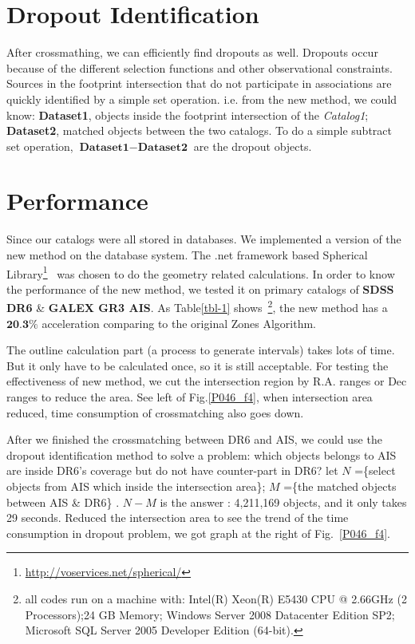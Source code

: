 \documentclass[11pt,twoside]{article}
\begin{document}
\section{Dropout Identification}
After crossmathing, we can efficiently find dropouts as well. Dropouts occur because of the different selection functions and other observational constraints. Sources in the footprint intersection that do not participate in associations are quickly identified by a simple set operation. i.e. from the new method, we could know: \textbf{Dataset1}, objects inside the footprint intersection of the \textit{Catalog1}; \textbf{Dataset2}, matched objects between the two catalogs. To do a simple subtract set operation, $\textbf{Dataset1}-\textbf{Dataset2}$ are the dropout objects.

\section{Performance}
Since our catalogs were all stored in databases. We implemented a version of the new method on the database system. The .net framework based Spherical Library\footnote{\url{http://voservices.net/spherical/}}~\citep{Budavari:2010ek, 2007cs........1163G} was chosen to do the geometry related calculations. In order to know the performance of the new method, we tested it on primary catalogs of \textbf{SDSS DR6} \& \textbf{GALEX GR3 AIS}. As Table\ref{tbl-1} shows~\footnote{all codes run on a machine with: Intel(R) Xeon(R) E5430 CPU @ 2.66GHz (2 Processors);24 GB Memory; Windows Server 2008 Datacenter Edition SP2; Microsoft SQL Server 2005 Developer Edition (64-bit).}, the new method has a $\textbf{20.3\%}$ acceleration comparing to the original Zones Algorithm.

The outline calculation part (a process to generate intervals) takes lots of time. But it only have to be calculated once, so it is still acceptable. For testing the effectiveness of new method, we cut the intersection region by R.A. ranges or Dec ranges to reduce the area. See left of Fig.\ref{P046_f4}, when intersection area reduced, time consumption of crossmatching also goes down.

After we finished the crossmatching between DR6 and AIS, we could use the dropout identification method to solve a problem: which objects belongs to AIS are inside DR6's coverage but do not have counter-part in DR6? let $N$ =\{select objects from AIS which inside the intersection area\}; $M$ =\{the matched objects between AIS \& DR6\} . $N-M$ is the answer : 4,211,169 objects, and it only takes 29 seconds. Reduced the intersection area to see the trend of the time consumption in dropout problem, we got graph at the right of Fig.~\ref{P046_f4}.
\end{document}
